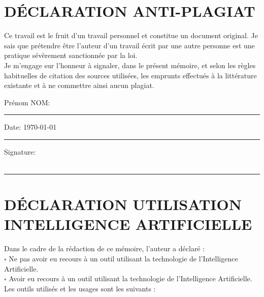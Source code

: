 \section*{\Large DÉCLARATION ANTI-PLAGIAT}
Ce travail est le fruit d'un travail personnel et constitue un document original. Je sais que prétendre être l'auteur d'un travail écrit par une autre personne est une pratique sévèrement sanctionnée par la loi.\\
Je m'engage sur l'honneur à signaler, dans le présent mémoire, et selon les règles habituelles de citation des sources utilisées, les emprunts effectués à la littérature existante et à ne commettre ainsi aucun plagiat.\\
\vspace*{1cm}

\noindent Prénom NOM: \\[1mm]
\rule[1em]{25em}{0.5pt}

\noindent Date: \today \\[1mm]
\rule[1em]{25em}{0.5pt}

\noindent Signature:\\[1mm]
\\
\rule[1em]{25em}{0.5pt}


\newpage
\section*{DÉCLARATION UTILISATION INTELLIGENCE ARTIFICIELLE}
\vspace*{1cm}
\noindent Dans le cadre de la rédaction de ce mémoire, l'auteur a déclaré :\\[0.5em]

\noindent $\square$ Ne pas avoir eu recours à un outil utilisant la technologie de l'Intelligence Artificielle.\\[0.5em]

\noindent $\square$ Avoir eu recours à un outil utilisant la technologie de l'Intelligence Artificielle.\\[0.5em]

\noindent Les outils utilisés et les usages sont les suivants : \\[0.5em]
\newpage
